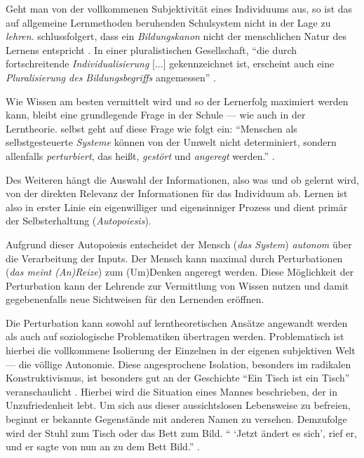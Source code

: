 Geht man von der vollkommenen Subjektivität eines Individuums aus, so ist das auf allgemeine Lernmethoden beruhenden Schulsystem nicht in der Lage zu \emph{lehren}.
\citeauthor{siebert-2003} schlussfolgert, dass ein \emph{Bildungskanon} nicht der menschlichen Natur des Lernens entspricht \parencite[vgl.][28]{siebert-2003}.
In einer pluralistischen Gesellschaft, ``die durch fortschreitende \emph{Individualisierung} [...] gekennzeichnet ist, erscheint auch eine \emph{Pluralisierung des Bildungsbegriffs} angemessen'' \parencite[vgl.][29]{siebert-2003}.

Wie Wissen am besten vermittelt wird und so der Lernerfolg maximiert werden kann, bleibt eine grundlegende Frage in der Schule --- wie auch in der Lerntheorie.
\citeauthor{siebert-2003} selbst geht auf diese Frage wie folgt ein:
``Menschen als selbstgesteuerte \emph{Systeme} können von der Umwelt nicht determiniert, sondern allenfalls \emph{perturbiert}, das heißt, \emph{gestört} und \emph{angeregt} werden.'' \parencite[vgl.][5]{siebert-2003}.

Des Weiteren hängt die Auswahl der Informationen, also was und ob gelernt wird, von der direkten Relevanz der Informationen für das Individuum ab.
Lernen ist also in erster Linie ein eigenwilliger und eigensinniger Prozess und dient primär der Selbsterhaltung (\emph{Autopoiesis}).

Aufgrund dieser Autopoiesis entscheidet der Mensch (\emph{das System}) \emph{autonom} über die Verarbeitung der Inputs.
Der Mensch kann maximal durch Perturbationen (\emph{das meint (An)Reize}) zum (Um)Denken angeregt werden.
Diese Möglichkeit der Perturbation kann der Lehrende zur Vermittlung von Wissen nutzen und damit gegebenenfalls neue Sichtweisen für den Lernenden eröffnen.

Die Perturbation kann sowohl auf lerntheoretischen Ansätze angewandt werden als auch auf soziologische Problematiken übertragen werden.
Problematisch ist hierbei die vollkommene Isolierung der Einzelnen in der eigenen subjektiven Welt --- die völlige Autonomie.
Diese angesprochene Isolation, besonders im radikalen Konstruktivismus, ist besonders gut an der Geschichte ``Ein Tisch ist ein Tisch'' veranschaulicht \parencite{bichsel-1990}.
Hierbei wird die Situation eines Mannes beschrieben, der in Unzufriedenheit lebt.
Um sich aus dieser aussichtslosen Lebensweise zu befreien, beginnt er bekannte Gegenstände mit anderen Namen zu versehen.
Demzufolge wird der Stuhl zum Tisch oder das Bett zum Bild.
`` `Jetzt ändert es sich', rief er, und er sagte von nun an zu dem Bett Bild.'' \parencite[vgl.][18]{bichsel-1990}.

